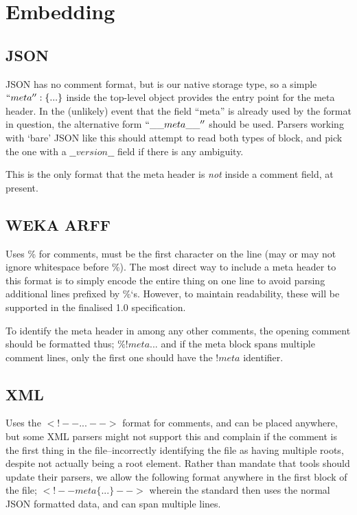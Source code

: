 \chapter{Embedding}

\section{JSON}
JSON has no comment format, but is our native storage type, so a simple $``meta'':\{ ... \}$ inside the top-level object provides the entry point for the meta header.
In the (unlikely) event that the field ``meta'' is already used by the format in question, the alternative form $``\_\_meta\_\_''$ should be used.
Parsers working with `bare' JSON like this should attempt to read both types of block, and pick the one with a $\_\_version\_\_$ field if there is any ambiguity.

This is the only format that the meta header is \textit{not} inside a comment field, at present.

\section{WEKA ARFF}
Uses \% for comments, must be the first character on the line (may or may not ignore whitespace before \%).
The most direct way to include a meta header to this format is to simply encode the entire thing on one line to avoid parsing additional lines prefixed by \%`s.
However, to maintain readability, these will be supported in the finalised 1.0 specification.

To identify the meta header in among any other comments, the opening comment should be formatted thus; $\%!meta {...}$ and if the meta block spans multiple comment lines, only the first one should have the $!meta$ identifier.

\section{XML}
Uses the $<!-- ... -->$ format for comments, and can be placed anywhere, but some XML parsers might not support this and complain if the comment is the first thing in the file--incorrectly identifying the file as having multiple roots, despite not actually being a root element.
Rather than mandate that tools should update their parsers, we allow the following format anywhere in the first block of the file; $<!-- meta \{ ... \} -->$ wherein the standard then uses the normal JSON formatted data, and can span multiple lines.

